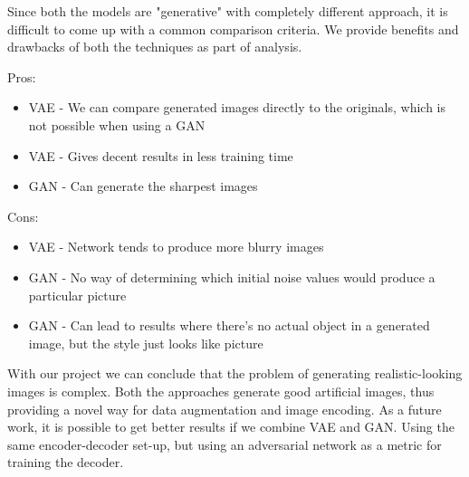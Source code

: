 \documentclass{article} %
\begin{document}
    Since both the models are "generative" with completely different approach, it is difficult to come up with a common comparison criteria. We provide benefits and drawbacks of both the techniques as part of analysis.

Pros:
\begin{itemize}
\item     VAE - We can compare generated images directly to the originals, which is not possible when using a GAN
\item     VAE - Gives decent results in less training time
\item     GAN - Can generate the sharpest images
    \end{itemize}
Cons:
\begin{itemize}
\item     VAE - Network tends to produce more blurry images
\item     GAN - No way of determining which initial noise values would produce a particular picture
\item     GAN - Can lead to results where there’s no actual object in a generated image, but the style just looks like picture
    \end{itemize}
    With our project we can conclude that the problem of generating realistic-looking images is complex. Both the approaches generate good artificial images, thus providing a novel way for data augmentation and image encoding. As a future work, it is possible to get better results if we combine VAE and GAN. Using the same encoder-decoder set-up, but using an adversarial network as a metric for training the decoder.
\end{document}
